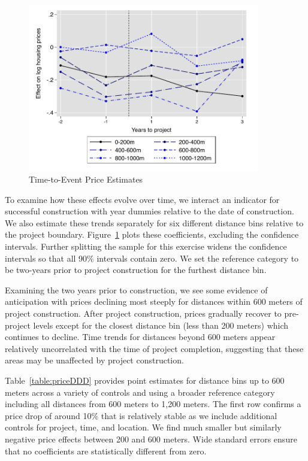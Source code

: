 \documentclass[12pt]{article}
\begin{document}
\begin{figure}
\caption{Time-to-Event Price Estimates}\label{figure:timeplot}
\centering
\includegraphics[width=0.9\textwidth,trim={0cm .1cm 0cm 0.1cm},clip=true]{figures/DDDplot_pertime_alt}
\vspace{-2mm}
\end{figure}

To examine how these effects evolve over time, we interact an indicator for successful construction with year dummies relative to the date of construction.  We also estimate these trends separately for six different distance bins relative to the project boundary.  Figure~\ref{figure:timeplot} plots these coefficients, excluding the confidence intervals.  Further splitting the sample for this exercise widens the confidence intervals so that all 90\% intervals contain zero.  We set the reference category to be two-years prior to project construction for the furthest distance bin.  

Examining the two years prior to construction, we see some evidence of anticipation with prices declining most steeply for distances within 600 meters of project construction.  After project construction, prices gradually recover to pre-project levels except for the closest distance bin (less than 200 meters) which continues to decline.  Time trends for distances beyond 600 meters appear relatively uncorrelated with the time of project completion, suggesting that these areas may be unaffected by project construction.

Table~\ref{table:priceDDD} provides point estimates for distance bins up to 600 meters across a variety of controls and using a broader reference category including all distances from 600 meters to 1,200 meters.  The first row confirms a price drop of around 10\% that is relatively stable as we include additional controls for project, time, and location.  We find much smaller but similarly negative price effects between 200 and 600 meters.  Wide standard errors ensure that no coefficients are statistically different from zero.
\end{document}
